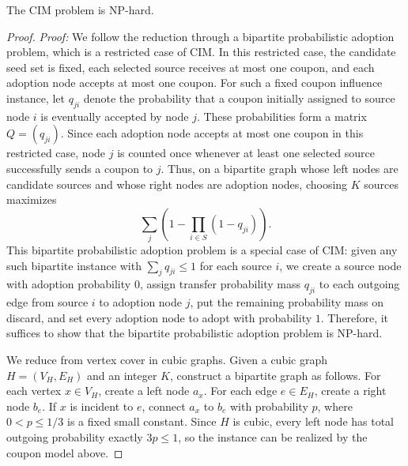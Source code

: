 \documentclass[sigconf]{acmart}
\begin{document}
\begin{theorem}
\label{thm:nphard}
The CIM problem is NP-hard.
\end{theorem}

\begin{proof}%
\emph{Proof:}
We follow the reduction through a bipartite probabilistic adoption
problem, which is a restricted case of CIM.
In this restricted case, the candidate seed set is fixed, each selected
source receives at most one coupon, and each adoption node accepts at
most one coupon.
For such a fixed coupon influence instance, let $q_{ji}$ denote the
probability that a coupon initially assigned to source node $i$ is
eventually accepted by node $j$.
These probabilities form a matrix $Q=(q_{ji})$.
Since each adoption node accepts at most one coupon in this restricted
case, node $j$ is counted once whenever at least one selected source
successfully sends a coupon to $j$.
Thus, on a bipartite graph whose left nodes are candidate sources and
whose right nodes are adoption nodes, choosing $K$ sources maximizes
\[
  \sum_j \left(1-\prod_{i\in S}(1-q_{ji})\right).
\]
This bipartite probabilistic adoption problem is a special case of CIM:
given any such bipartite instance with
\(\sum_j q_{ji}\leq 1\) for each source $i$, we create a source node
with adoption probability $0$, assign transfer probability mass
$q_{ji}$ to each outgoing edge from source $i$ to adoption node $j$, put
the remaining probability mass on discard, and set every adoption node
to adopt with probability $1$.
Therefore, it suffices to show that the bipartite probabilistic adoption
problem is NP-hard.

We reduce from vertex cover in cubic graphs.
Given a cubic graph $H=(V_H,E_H)$ and an integer $K$, construct a
bipartite graph as follows.
For each vertex $x\in V_H$, create a left node $a_x$.
For each edge $e\in E_H$, create a right node $b_e$.
If $x$ is incident to $e$, connect $a_x$ to $b_e$ with probability $p$,
where $0<p\leq 1/3$ is a fixed small constant.
Since $H$ is cubic, every left node has total outgoing probability
exactly $3p\leq 1$, so the instance can be realized by the coupon model
above.



\end{proof}
\end{document}
